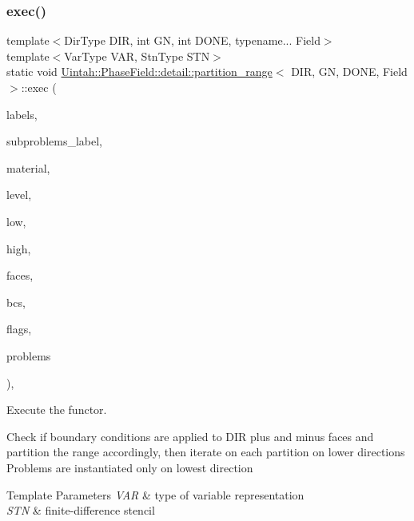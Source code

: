 \subsubsection{\texorpdfstring{exec()}{exec()}}
{\footnotesize\ttfamily template$<$Dir\+Type D\+IR, int GN, int D\+O\+NE, typename... Field$>$ \\
template$<$Var\+Type V\+AR, Stn\+Type S\+TN$>$ \\
static void \hyperlink{structUintah_1_1PhaseField_1_1detail_1_1partition__range}{Uintah\+::\+Phase\+Field\+::detail\+::partition\+\_\+range}$<$ D\+IR, GN, D\+O\+NE, Field $>$\+::exec (\begin{DoxyParamCaption}\item[{const typename Field\+::label\+\_\+type \&...}]{labels,  }\item[{const Var\+Label $\ast$}]{subproblems\+\_\+label,  }\item[{int}]{material,  }\item[{const Level $\ast$}]{level,  }\item[{Int\+Vector}]{low,  }\item[{Int\+Vector}]{high,  }\item[{std\+::list$<$ Patch\+::\+Face\+Type $>$}]{faces,  }\item[{const std\+::array$<$ \hyperlink{structUintah_1_1PhaseField_1_1BCInfo}{B\+C\+Info}$<$ Field $>$, 2 $\ast$\hyperlink{structUintah_1_1PhaseField_1_1get__stn}{get\+\_\+stn}$<$ S\+TN $>$\+::dim $>$ \&...}]{bcs,  }\item[{std\+::array$<$ bool, 2 $\ast$\hyperlink{structUintah_1_1PhaseField_1_1get__stn}{get\+\_\+stn}$<$ S\+TN $>$\+::dim $>$ \&}]{flags,  }\item[{std\+::list$<$ \hyperlink{classUintah_1_1PhaseField_1_1Problem}{Problem}$<$ V\+AR, S\+TN, Field... $>$ $>$ \&}]{problems }\end{DoxyParamCaption})\hspace{0.3cm}{\ttfamily [inline]}, {\ttfamily [static]}}



Execute the functor. 

Check if boundary conditions are applied to D\+IR plus and minus faces and partition the range accordingly, then iterate on each partition on lower directions Problems are instantiated only on lowest direction


\begin{DoxyTemplParams}{Template Parameters}
{\em V\+AR} & type of variable representation \\
\hline
{\em S\+TN} & finite-\/difference stencil \\
\hline
\end{DoxyTemplParams}

